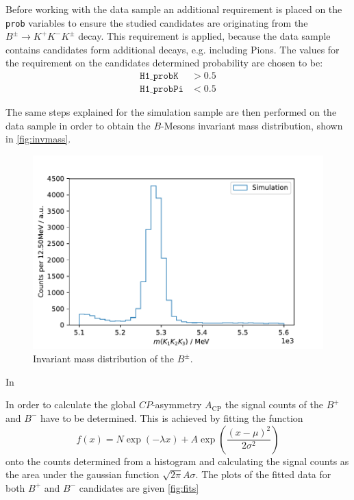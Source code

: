 Before working with the data sample an additional requirement is placed on the \texttt{prob} variables to ensure the studied candidates are originating from the $B^\pm \rightarrow K^+ K^- K^\pm$ decay. This requirement is applied, because the data sample contains candidates form additional decays, e.g. including Pions. The values for the requirement on the candidates determined probability are chosen to be: 
\begin{align}
	\mathtt{H1\_probK} &> 0.5\\
	\mathtt{H1\_probPi} &< 0.5
\end{align}

The same steps explained for the simulation sample are then performed on the data sample in order to obtain the $B$-Mesons invariant mass distribution, shown in \autoref{fig:invmass}. 

\begin{figure}
	\centering
	\includegraphics[width=0.7\linewidth]{content/pictures/image_fin/invmass}
	\caption{Invariant mass distribution of the $B^\pm$.}
	\label{fig:invmass}
\end{figure}
In 

In order to calculate the global $CP$-asymmetry $A_\mathrm{CP}$ the signal counts of the $B^+$ and $B^-$ have to be determined. This is achieved by fitting the function 
\begin{equation}
	f(x) = N\exp\left(-\lambda x\right) + A  \exp\left(\frac{(x-\mu)^2}{2\sigma^2}\right)
	\label{eq:fit}
\end{equation} 
onto the counts determined from a histogram and calculating the signal counts as the area under the gaussian function $\sqrt{2\pi}A\sigma$. The plots of the fitted data for both $B^+$ and $B^-$ candidates are given \autoref{fig:fits}



